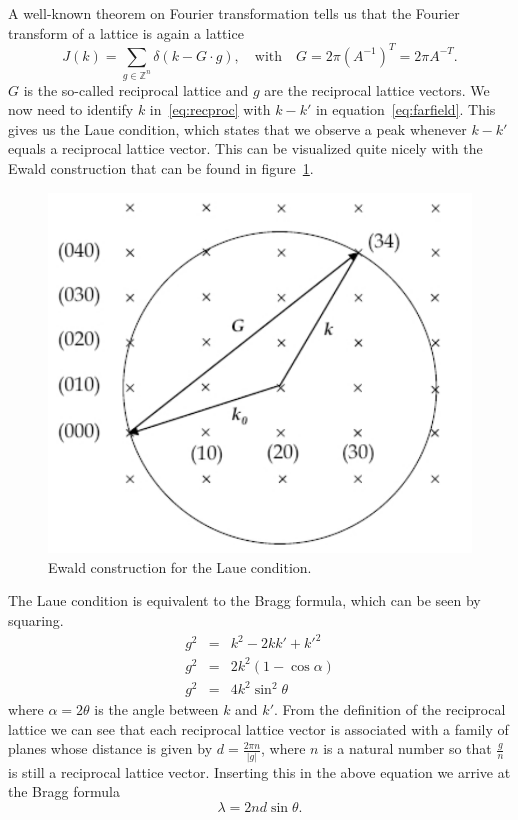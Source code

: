 \documentclass[a4paper,10pt]{scrartcl}
\begin{document}
A well-known theorem on Fourier transformation tells us that the Fourier transform of a lattice is again a lattice
\begin{equation}
J(k)=\sum_{g\in\mathbb{Z}^{n}}\delta(k-G \cdot g),\quad \mbox{with} \quad G=2\pi(A^{-1})^{T}=2\pi A^{-T}. \label{eq:recproc}
\end{equation}
$G$ is the so-called reciprocal lattice and $g$ are the reciprocal lattice vectors. We now need to identify $k$ in~\eqref{eq:recproc} with $k-k'$ in equation~\eqref{eq:farfield}. This gives us the Laue condition, which states that we observe a peak whenever $k-k'$ equals a reciprocal lattice vector. This can be visualized quite nicely with the Ewald construction that can be found in figure~\ref{fig:ewald}.

\begin{figure}
\centering
\includegraphics[scale=0.45]{img/ewald}
\caption{Ewald construction for the Laue condition. \label{fig:ewald}}
\end{figure}

The Laue condition is equivalent to the Bragg formula, which can be seen by squaring.
\begin{eqnarray}
g^{2} & = & k^{2}-2kk'+k'^{2} \\  
g^{2} & = & 2k^{2} (1-\cos \alpha) \\
g^{2} & = & 4k^{2}\sin^{2}\theta \label{eq:prebragg}
\end{eqnarray}
where $\alpha = 2 \theta$ is the angle between $k$ and $k'$. From the definition of the reciprocal lattice we can see that each reciprocal lattice vector is associated with a family of planes whose distance is given by $d=\tfrac{2\pi n}{|g|}$, where $n$ is a natural number so that $\tfrac{g}{n}$ is still a reciprocal lattice vector. Inserting this in the above equation we arrive at the Bragg formula
\begin{equation}
\lambda=2nd\sin\theta. \label{eq:bragg}
\end{equation}
\end{document}
